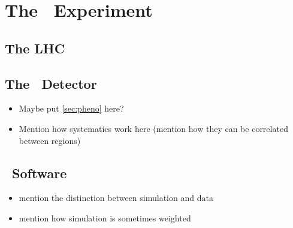 \chapter{The \atlas\ Experiment}
\section{The LHC}
\section{The \atlas\ Detector}
\begin{itemize}
\item Maybe put \cref{sec:pheno} here?
\item Mention how systematics work here (mention how they can be correlated between regions)
\end{itemize}
\section{\atlas\ Software}
\begin{itemize}
\item mention the distinction between simulation and data
\item mention how simulation is sometimes weighted
\end{itemize}
